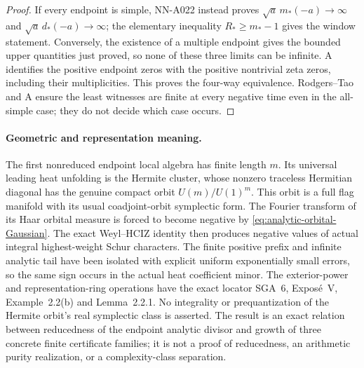 \begin{proof}
If every endpoint is simple, NN-A022 instead proves
$\sqrt a\,m_*(-a)\to\infty$ and
$\sqrt a\,d_*(-a)\to\infty$; the elementary inequality
$R_*\ge m_*-1$ gives the window statement. Conversely, the existence
of a multiple endpoint gives the bounded upper quantities just proved,
so none of these three limits can be infinite. A identifies the
positive endpoint zeros with the positive nontrivial zeta zeros,
including their multiplicities. This proves the four-way equivalence.
Rodgers--Tao and A ensure the least witnesses are finite at every
negative time even in the all-simple case; they do not decide which
case occurs.
\end{proof}

\paragraph{Geometric and representation meaning.}
The first nonreduced endpoint local algebra has finite length $m$.
Its universal leading heat unfolding is the Hermite cluster, whose
nonzero traceless Hermitian diagonal has the genuine compact orbit
$U(m)/U(1)^m$. This orbit is a full flag manifold with its usual
coadjoint-orbit symplectic form. The Fourier transform of its Haar
orbital measure is forced to become negative by
\eqref{eq:analytic-orbital-Gaussian}. The exact Weyl--HCIZ identity
then produces negative values of actual integral highest-weight
Schur characters. The finite positive prefix and infinite analytic
tail have been isolated with explicit uniform exponentially small
errors, so the same sign occurs in the actual heat coefficient minor.
The exterior-power and representation-ring operations have the exact
locator SGA~6, Expos\'e~V, Example~2.2(b) and Lemma~2.2.1.
No integrality or prequantization of the Hermite orbit's real symplectic
class is asserted. The result is an exact relation between reducedness
of the endpoint analytic divisor and growth of three concrete finite
certificate families; it is not a proof of reducedness, an arithmetic
purity realization, or a complexity-class separation.
